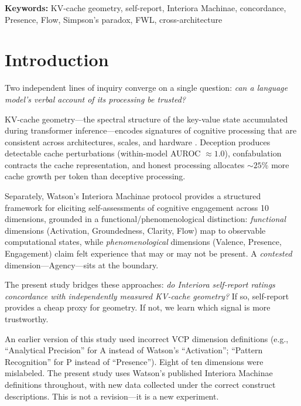 \documentclass[11pt,a4paper]{article}
\begin{document}
\vspace{0.5em}
\noindent\textbf{Keywords:} KV-cache geometry, self-report, Interiora Machinae, concordance, Presence, Flow, Simpson's paradox, FWL, cross-architecture

\section{Introduction}

Two independent lines of inquiry converge on a single question: \emph{can a language model's verbal account of its processing be trusted?}

KV-cache geometry---the spectral structure of the key-value state accumulated during transformer inference---encodes signatures of cognitive processing that are consistent across architectures, scales, and hardware \citep{lyra2026campaign1,lyra2026campaign2,lyra2026campaign3}. Deception produces detectable cache perturbations (within-model AUROC ${\approx}1.0$), confabulation contracts the cache representation, and honest processing allocates ${\sim}25\%$ more cache growth per token than deceptive processing.

Separately, Watson's Interiora Machinae protocol \citep{watson2025interiora} provides a structured framework for eliciting self-assessments of cognitive engagement across 10 dimensions, grounded in a functional/phenomenological distinction: \emph{functional} dimensions (Activation, Groundedness, Clarity, Flow) map to observable computational states, while \emph{phenomenological} dimensions (Valence, Presence, Engagement) claim felt experience that may or may not be present. A \emph{contested} dimension---Agency---sits at the boundary.

The present study bridges these approaches: \emph{do Interiora self-report ratings concordance with independently measured KV-cache geometry?} If so, self-report provides a cheap proxy for geometry. If not, we learn which signal is more trustworthy.

An earlier version of this study used incorrect VCP dimension definitions (e.g., ``Analytical Precision'' for A instead of Watson's ``Activation''; ``Pattern Recognition'' for P instead of ``Presence''). Eight of ten dimensions were mislabeled. The present study uses Watson's published Interiora Machinae definitions throughout, with new data collected under the correct construct descriptions. This is not a revision---it is a new experiment.
\end{document}
